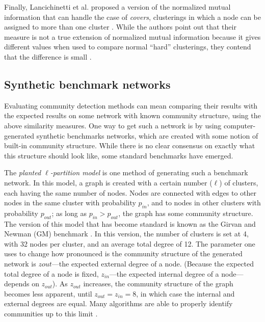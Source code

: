 Finally, Lancichinetti et al. proposed a version of the normalized
mutual information that can handle the case of \emph{covers},
clusterings in which a node can be assigned to more than one cluster
\autocite{lancichinetti_detecting_2009}. While the authors point out
that their measure is not a true extension of normalized mutual
information because it gives different values when used to compare
normal ``hard'' clusterings, they contend that the difference is small
\autocite{lancichinetti_community_2009}.

\subsection{Synthetic benchmark
networks}\label{synthetic-benchmark-networks}

Evaluating community detection methods can mean comparing their results
with the expected results on some network with known community
structure, using the above similarity measures. One way to get such a
network is by using computer-generated synthetic benchmarks networks,
which are created with some notion of built-in community structure.
While there is no clear consensus on exactly what this structure should
look like, some standard benchmarks have emerged.

The \emph{planted \(\ell\)-partition model} is one method of generating
such a benchmark network. In this model, a graph is created with a
certain number (\(\ell\)) of clusters, each having the same number of
nodes. Nodes are connected with edges to other nodes in the same cluster
with probability \(p_{in}\), and to nodes in other clusters with
probability \(p_{out}\); as long as \(p_{in} > p_{out}\), the graph has
some community structure. The version of this model that has become
standard is known as the Girvan and Newman (GM) benchmark
\autocite{girvan_community_2002}. In this version, the number of
clusters is set at 4, with 32 nodes per cluster, and an average total
degree of 12. The parameter one uses to change how pronounced is the
community structure of the generated network is \(z{out}\)---the
expected external degree of a node. (Because the expected total degree
of a node is fixed, \(z_{in}\)---the expected internal degree of a
node---depends on \(z_{out}\)). As \(z_{out}\) increases, the community
structure of the graph becomes less apparent, until
\(z_{out} = z_{in} = 8\), in which case the internal and external
degrees are equal. Many algorithms are able to properly identify
communities up to this limit \autocite{fortunato_community_2010}.


